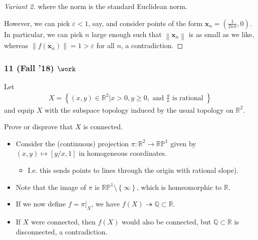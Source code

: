 \begin{solution}
\begin{proof}[Variant 2]
where the norm is the standard Euclidean norm.

However, we can pick \(\varepsilon < 1\), say, and consider points of
the form \(\mathbf{x}_n = (\frac{1}{2n\pi}, 0)\). In particular, we can
pick \(n\) large enough such that
\({\left\lVert {\mathbf{x}_n} \right\rVert}\) is as small as we like,
whereas
\({\left\lVert {f(\mathbf{x}_n)} \right\rVert} = 1 > \varepsilon\) for
all \(n\), a contradiction.

\end{proof}

\end{solution}

\hypertarget{fall-18-work-1}{%
\subsubsection{\texorpdfstring{11 (Fall '18)
\(\work\)}{11 (Fall '18) \textbackslash work}}\label{fall-18-work-1}}

\begin{problem}[?]

Let
\begin{align*} X=\left\{(x, y) \in \mathbb{R}^{2} | x>0, y \geq 0, \text { and } \frac{y}{x} \text { is rational }\right\} \end{align*}
and equip \(X\) with the subspace topology induced by the usual topology
on \({\mathbb{R}}^2\).

Prove or disprove that \(X\) is connected.

\end{problem}


\begin{solution}

\envlist

\begin{itemize}
\item
  Consider the (continuous) projection
  \(\pi: {\mathbb{R}}^2 \to {\mathbb{RP}}^1\) given by
  \((x, y) \mapsto [y/x, 1]\) in homogeneous coordinates.

  \begin{itemize}
  \tightlist
  \item
    I.e. this sends points to lines through the origin with rational
    slope).
  \end{itemize}
\item
  Note that the image of \(\pi\) is
  \({\mathbb{RP}}^1\setminus\left\{{\infty}\right\}\), which is
  homeomorphic to \({\mathbb{R}}\).
\item
  If we now define \(f = {\left.{{\pi}} \right|_{{X}} }\), we have
  \(f(X) \twoheadrightarrow{\mathbb{Q}}\subset {\mathbb{R}}\).
\item
  If \(X\) were connected, then \(f(X)\) would also be connected, but
  \({\mathbb{Q}}\subset {\mathbb{R}}\) is disconnected, a contradiction.
\end{itemize}

\end{solution}

